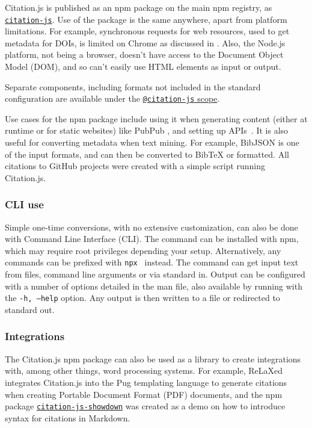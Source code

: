 \documentclass[fleqn,10pt,lineno]{wlpeerj} %
\begin{document}
Citation.js is published as an npm package on the main npm registry, as \href{https://npm.im/citation-js}{\texttt{citation-js}}. Use of the package is the same anywhere, apart from platform limitations. For example, synchronous requests for web resources, used to get metadata for DOIs, is limited on Chrome as discussed in \cite{willighagen_make_2017}. Also, the Node.js platform, not being a browser, doesn't have access to the Document Object Model (DOM), and so can't easily use HTML elements as input or output.

Separate components, including formats not included in the standard configuration are available under the \href{https://www.npmjs.com/org/citation-js}{\texttt{@citation-js} scope}.

Use cases for the npm package include using it when generating content (either at runtime or for static websites) like PubPub \citep{shihipar_pubpub:_2018}, and setting up APIs~\citep{willighagen_citation.js:_2017}. It is also useful for converting metadata when text mining. For example, BibJSON is one of the input formats, and can then be converted to BibTeX or formatted. All citations to GitHub projects were created with a simple script running Citation.js.

\subsubsection*{CLI use}

Simple one-time conversions, with no extensive customization, can also be done with Command Line Interface (CLI). The command can be installed with npm, which may require root privileges depending your setup. Alternatively, any commands can be prefixed with \texttt{npx } instead. The command can get input text from files, command line arguments or via standard in. Output can be configured with a number of options detailed in the man file, also available by running with the \texttt{-h, --help} option. Any output is then written to a file or redirected to standard out.

\subsubsection*{Integrations}

The Citation.js npm package can also be used as a library to create integrations with, among other things, word processing systems. For example, ReLaXed \citep{null2018RelaxedJS/ReLaXed} integrates Citation.js into the Pug templating language to generate citations when creating Portable Document Format (PDF) documents, and the npm package \href{https://npm.im/citation-js-showdown}{\texttt{citation-js-showdown}} was created as a demo on how to introduce syntax for citations in Markdown.
\end{document}

